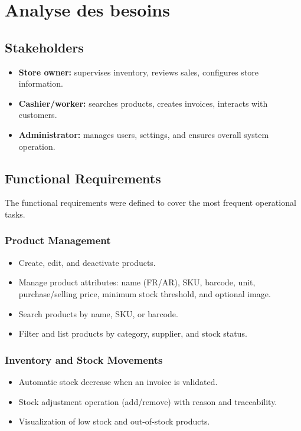 \documentclass[12pt,a4paper]{report}
\begin{document}
\chapter{Analyse des besoins}

\section{Stakeholders}
\begin{itemize}
  \item \textbf{Store owner:} supervises inventory, reviews sales, configures store information.
  \item \textbf{Cashier/worker:} searches products, creates invoices, interacts with customers.
  \item \textbf{Administrator:} manages users, settings, and ensures overall system operation.
\end{itemize}

\section{Functional Requirements}
The functional requirements were defined to cover the most frequent operational tasks.

\subsection*{Product Management}
\begin{itemize}
  \item Create, edit, and deactivate products.
  \item Manage product attributes: name (FR/AR), SKU, barcode, unit, purchase/selling price, minimum stock threshold, and optional image.
  \item Search products by name, SKU, or barcode.
  \item Filter and list products by category, supplier, and stock status.
\end{itemize}

\subsection*{Inventory and Stock Movements}
\begin{itemize}
  \item Automatic stock decrease when an invoice is validated.
  \item Stock adjustment operation (add/remove) with reason and traceability.
  \item Visualization of low stock and out-of-stock products.
\end{itemize}
\end{document}

